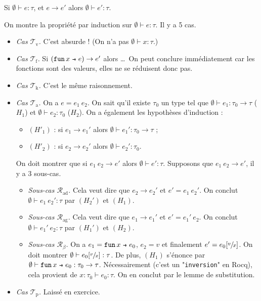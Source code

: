 \documentclass[../main]{subfiles}
\begin{document}
  \begin{prop}
    Si $\emptyset \vdash e : \tau$, et $e \to e'$ alors $\emptyset \vdash e' : \tau$.
  \end{prop}
  \begin{prv}
    On montre la propriété par induction sur $\emptyset \vdash e : \tau$.
    Il y a 5 cas.
    \begin{itemize}
      \item \textsl{Cas $\mathcal{T}_\mathrm{v}$.} C'est absurde ! (On n'a pas $\emptyset \vdash x : \tau$.)
      \item \textsl{Cas $\mathcal{T}_\mathrm{f}$.} Si $(\fun x e)\to e'$ alors \ldots\ On peut conclure immédiatement car les fonctions sont des valeurs, elles ne se réduisent donc pas.
      \item \textsl{Cas $\mathcal{T}_\mathrm{k}$.} C'est le même raisonnement.
      \item \textsl{Cas $\mathcal{T}_\mathrm{a}$.} On a $e = e_1\ e_2$.
        On sait qu'il existe $\tau_0$ un type tel que $\emptyset \vdash e_1 : \tau_0 \to \tau$ ($H_1$) et $\emptyset \vdash e_2 : \tau_0$ ($H_2$).
        On a également les hypothèses d'induction :
        \begin{itemize}
          \item $(H'_1)$ : si $e_1 \to e_1'$ alors $\emptyset\vdash e_1' : \tau_0 \to \tau$ ;
          \item $(H'_2)$ : si $e_2 \to e_2'$ alors $\emptyset\vdash e_2' : \tau_0$.
        \end{itemize}
        On doit montrer que si $e_1 \ e_2 \to e'$ alors $\emptyset \vdash e' : \tau$.
        Supposons que $e_1\ e_2 \to e'$, il y a 3 sous-cas.
        \begin{itemize}
          \item \textit{Sous-cas $\mathcal{R}_\mathrm{ad}$.}
            Cela veut dire que $e_2 \to e_2'$ et $e' = e_1\ e_2'$.
            On conclut $\emptyset \vdash e_1 \ e_2' : \tau$ par $(H_2')$ et $(H_1)$.
          \item \textit{Sous-cas $\mathcal{R}_\mathrm{ag}$.}
            Cela veut dire que $e_1 \to e_1'$ et $e' = e_1'\ e_2$.
            On conclut $\emptyset \vdash e_1'\ e_2 : \tau$ par $(H_1')$ et $(H_2)$.
          \item \textit{Sous-cas $\mathcal{R}_\beta$.}
            On a $e_1 = \fun x e_0$, $e_2 = v$ et finalement $e' = e_0[\sfrac{v}{x}]$.
            On doit montrer $\emptyset \vdash e_0[\sfrac{v}{x}] : \tau$.
            De plus, $(H_1)$ s'énonce par $\emptyset \vdash \fun x e_0 : \tau_0 \to \tau$.
            Nécessairement (c'est un "\texttt{inversion}" en Rocq), cela provient de $x : \tau_0 \vdash e_0 : \tau$.
            On en conclut par le lemme de substitution.
        \end{itemize}
      \item \textsl{Cas $\mathcal{T}_\mathrm{p}$.} Laissé en exercice.
    \end{itemize}
  \end{prv}
\end{document}
